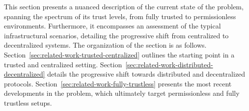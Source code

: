 This section presents a nuanced description of the current state of the \pol{} problem, spanning the spectrum of its trust levels, from fully trusted to permissionless environments. Furthermore, it encompasses an assessment of the typical infrastructural scenarios, detailing the progressive shift from centralized to decentralized systems. The organization of the section is as follows. Section~\ref{sec:related-work-trusted-centralized} outlines the starting point in a trusted and centralized setting. Section~\ref{sec:related-work-distributed-decentralized} details the progressive shift towards distributed and decentralized protocols. Section~\ref{sec:related-work-fully-trustless} presents the most recent developments in the \pol{} problem, which ultimately target permissionless and fully trustless setups.


























